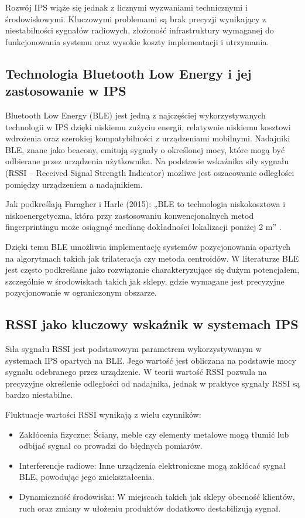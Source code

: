 Rozwój IPS wiąże się jednak z licznymi wyzwaniami technicznymi i środowiskowymi. Kluczowymi problemami są brak precyzji wynikający z niestabilności sygnałów radiowych, złożoność infrastruktury wymaganej do funkcjonowania systemu oraz wysokie koszty implementacji i utrzymania.

\subsection{Technologia Bluetooth Low Energy i jej zastosowanie w IPS}
Bluetooth Low Energy (BLE) jest jedną z najczęściej wykorzystywanych technologii w IPS dzięki niskiemu zużyciu energii, relatywnie niskiemu kosztowi wdrożenia oraz szerokiej kompatybilności z urządzeniami mobilnymi. Nadajniki BLE, znane jako beacony, emitują sygnały o określonej mocy, które mogą być odbierane przez urządzenia użytkownika. Na podstawie wskaźnika siły sygnału (RSSI – Received Signal Strength Indicator) możliwe jest oszacowanie odległości pomiędzy urządzeniem a nadajnikiem.

Jak podkreślają Faragher i Harle (2015): „BLE to technologia niskokosztowa i niskoenergetyczna, która przy zastosowaniu konwencjonalnych metod fingerprintingu może osiągnąć medianę dokładności lokalizacji poniżej 2 m” \cite{Faragher2015}.

Dzięki temu BLE umożliwia implementację systemów pozycjonowania opartych na algorytmach takich jak trilateracja czy metoda centroidów. W literaturze BLE jest często podkreślane jako rozwiązanie charakteryzujące się dużym potencjałem, szczególnie w środowiskach takich jak sklepy, gdzie wymagane jest precyzyjne pozycjonowanie w ograniczonym obszarze.

\subsection{RSSI jako kluczowy wskaźnik w systemach IPS}
Siła sygnału RSSI jest podstawowym parametrem wykorzystywanym w systemach IPS opartych na BLE. Jego wartość jest obliczana na podstawie mocy sygnału odebranego przez urządzenie. W teorii wartość RSSI pozwala na precyzyjne określenie odległości od nadajnika, jednak w praktyce sygnały RSSI są bardzo niestabilne.

Fluktuacje wartości RSSI wynikają z wielu czynników:
\begin{itemize}
    \item Zakłócenia fizyczne: Ściany, meble czy elementy metalowe mogą tłumić lub odbijać sygnał co prowadzi do błędnych pomiarów.
    \item Interferencje radiowe: Inne urządzenia elektroniczne mogą zakłócać sygnał BLE, powodując jego zniekształcenia.
    \item Dynamiczność środowiska: W miejscach takich jak sklepy obecność klientów, ruch oraz zmiany w ułożeniu produktów dodatkowo destabilizują sygnał.
\end{itemize}

